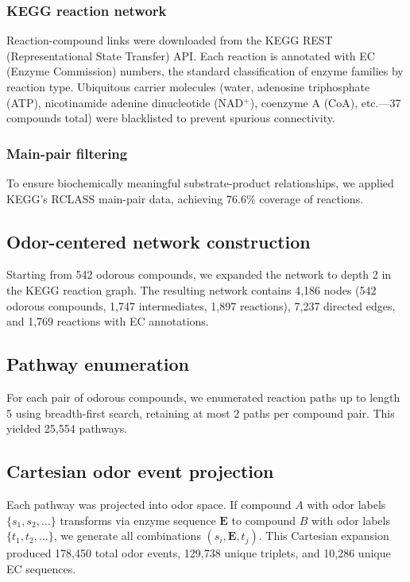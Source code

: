 \documentclass[a4paper,fleqn]{cas-sc}
\begin{document}
\subsubsection{KEGG reaction network}
Reaction-compound links were downloaded from the KEGG REST (Representational State Transfer) API. Each reaction is annotated with EC (Enzyme Commission) numbers, the standard classification of enzyme families by reaction type. Ubiquitous carrier molecules (water, adenosine triphosphate (ATP), nicotinamide adenine dinucleotide (NAD$^+$), coenzyme A (CoA), etc.---37 compounds total) were blacklisted to prevent spurious connectivity.

\subsubsection{Main-pair filtering}
To ensure biochemically meaningful substrate-product relationships, we applied KEGG's RCLASS main-pair data, achieving 76.6\% coverage of reactions.

\subsection{Odor-centered network construction}

Starting from 542 odorous compounds, we expanded the network to depth 2 in the KEGG reaction graph. The resulting network contains 4,186 nodes (542 odorous compounds, 1,747 intermediates, 1,897 reactions), 7,237 directed edges, and 1,769 reactions with EC annotations.

\subsection{Pathway enumeration}

For each pair of odorous compounds, we enumerated reaction paths up to length 5 using breadth-first search, retaining at most 2 paths per compound pair. This yielded 25,554 pathways.

\subsection{Cartesian odor event projection}

Each pathway was projected into odor space. If compound $A$ with odor labels $\{s_1, s_2, \ldots\}$ transforms via enzyme sequence $\mathbf{E}$ to compound $B$ with odor labels $\{t_1, t_2, \ldots\}$, we generate all combinations $(s_i, \mathbf{E}, t_j)$. This Cartesian expansion produced 178,450 total odor events, 129,738 unique triplets, and 10,286 unique EC sequences.
\end{document}

